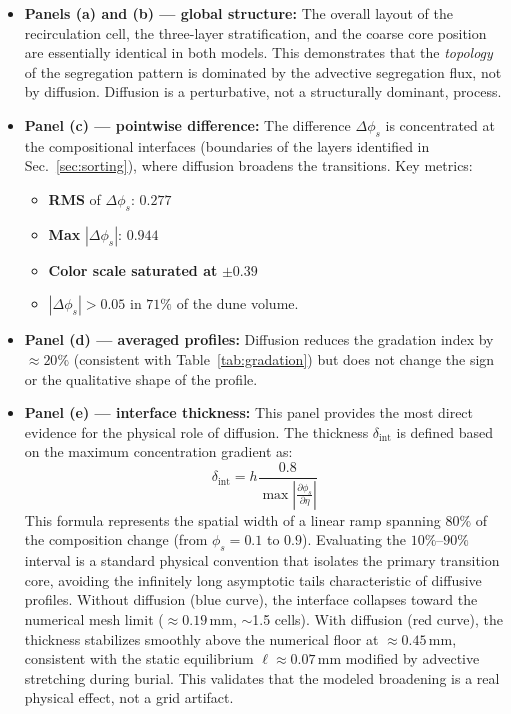 \documentclass[12pt, a4paper]{article}
\begin{document}
\begin{itemize}
    \item \textbf{Panels (a) and (b) --- global structure:} The overall layout
          of the recirculation cell, the three-layer stratification, and the
          coarse core position are essentially identical in both models. This
          demonstrates that the \emph{topology} of the segregation pattern is
          dominated by the advective segregation flux, not by diffusion.
          Diffusion is a perturbative, not a structurally dominant, process.

    \item \textbf{Panel (c) --- pointwise difference:} The difference
          $\Delta\phi_s$ is concentrated at the compositional interfaces
          (boundaries of the layers identified in Sec.~\ref{sec:sorting}),
          where diffusion broadens the transitions. Key metrics:
          \begin{itemize}
              \item \textbf{RMS} of $\Delta\phi_s$: $0.277$
              \item \textbf{Max} $|\Delta\phi_s|$: $0.944$
              \item \textbf{Color scale saturated at} $\pm0.39$
              \item $|\Delta\phi_s| > 0.05$ in $71\%$ of the dune volume.
          \end{itemize}

    \item \textbf{Panel (d) --- averaged profiles:} Diffusion reduces the
          gradation index by $\approx 20\%$ (consistent with
          Table~\ref{tab:gradation}) but does not change the sign or the
          qualitative shape of the profile.

    \item \textbf{Panel (e) --- interface thickness:} This panel provides
          the most direct evidence for the physical role of diffusion.
          The thickness $\delta_{\text{int}}$ is defined based on the maximum concentration gradient as:
          \begin{equation}
              \delta_{\text{int}} = h \frac{0.8}{\max \left| \frac{\partial \phi_s}{\partial \eta} \right|}
          \end{equation}
          This formula represents the spatial width of a linear ramp spanning $80\%$ of the composition change (from $\phi_s = 0.1$ to $0.9$). Evaluating the $10\%$--$90\%$ interval is a standard physical convention that isolates the primary transition core, avoiding the infinitely long asymptotic tails characteristic of diffusive profiles.
          Without diffusion (blue curve), the interface collapses toward
          the numerical mesh limit ($\approx 0.19$\,mm, $\sim$1.5 cells).
          With diffusion (red curve), the thickness stabilizes smoothly
          above the numerical floor at $\approx 0.45$\,mm, consistent
          with the static equilibrium $\ell \approx 0.07$\,mm modified
          by advective stretching during burial. This validates that
          the modeled broadening is a real physical effect, not a grid artifact.
\end{itemize}
\end{document}
